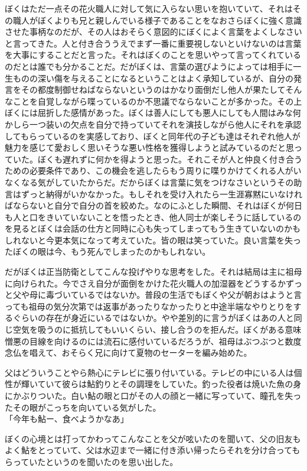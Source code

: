 \documentclass[b5j,twoside,twocolumn]{utarticle}
\begin{document}
ぼくはただ一点その花火職人に対して気に入らない思いを抱いていて、それはその職人がぼくよりも兄と親しんでいる様子であることをなおさらぼくに強く意識させた事柄なのだが、その人はおそらく意図的にぼくによく言葉をよくしなさいと言ってきた。人と付き合ううえでまず一番に重要視しないといけないのは言葉を大事にすることだと言った。それはぼくのことを思いやって言ってくれているのだとは誰でも分かることだ。だがぼくは、言葉の選びようによっては相手に一生ものの深い傷を与えることになるということはよく承知しているが、自分の発言をその都度制御せねばならないというのはかなり面倒だし他人が果たしてそんなことを自覚しながら喋っているのか不思議でならないことが多かった。その上ぼくには屈折した感情があった。ぼくは善人にしても悪人にしても人間はみな何かしら一つ装いの欠点を自分で持っていてそれを演技しながら他人にそれを承認してもらっているのを実感しており、ぼくと同年代の子ども達はそれぞれ他人が魅力を感じて愛おしく思いそうな悪い性格を獲得しようと試みているのだと思っていた。ぼくも遅れずに何かを得ようと思った。それこそが人と仲良く付き合うための必要条件であり、この機会を逃したらもう周りに喋りかけてくれる人がいなくなる気がしていたからだ。だからぼくは言葉に気をつけなさいというその助言はずっと納得がいかなかった。もしそれを受け入れたら一生涯寡黙にいなければならないと自分で自分の首を絞めた。なのにふとした瞬間、それはぼくが何日も人と口をきいていないことを悟ったとき、他人同士が楽しそうに話しているのを見るとぼくは会話の仕方と同時に心も失ってしまってもう生きていないのかもしれないと今更本気になって考えていた。皆の眼は笑っていた。良い言葉を失ったぼくの眼は今、もう死んでしまったのかもしれない。


だがぼくは正当防衛としてこんな投げやりな思考をした。それは結局は主に祖母に向けられた。今でさえ自分が面倒をかけた花火職人の加湿器をどうするかずっと父や母に毒づいているではないか。普段の生活でもぼくや父が朝おはようと言っても祖母の気分次第では返事があったりなかったりと中途半端なやりとりをするぐらいの存在が身近にいるではないか。やや差別的に言うがぼくはあの人と同じ空気を吸うのに抵抗してもいいくらい、接し合うのを拒んだ。ぼくがある意味憎悪の目線を向けるのには流石に感付いているだろうが、祖母はぶつぶつと数度念仏を唱えて、おそらく兄に向けて夏物のセーターを編み始めた。


父はどういうことやら熱心にテレビに張り付いている。テレビの中にいる人は個性が輝いていて彼らは鮎釣りとその調理をしていた。釣った役者は焼いた魚の身にかぶりついた。白い鮎の眼と口がその人の顔と一緒に写っていて、瞳孔を失ったその眼がこっちを向いている気がした。\\
「今年も鮎ー、食べようかなあ」


ぼくの心境とは打ってかわってこんなことを父が呟いたのを聞いて、父の旧友もよく鮎をとっていて、父は水辺まで一緒に付き添い帰ったらそれを分け合ってもらっていたというのを聞いたのを思い出した。
\end{document}
